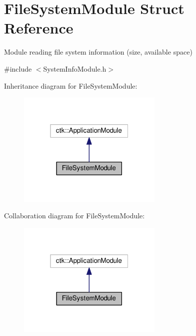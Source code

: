 \hypertarget{structFileSystemModule}{}\section{File\+System\+Module Struct Reference}
\label{structFileSystemModule}


Module reading file system information (size, available space)  




{\ttfamily \#include $<$System\+Info\+Module.\+h$>$}



Inheritance diagram for File\+System\+Module\+:
\nopagebreak
\begin{figure}[H]
\begin{center}
\leavevmode
\includegraphics[width=196pt]{structFileSystemModule__inherit__graph}
\end{center}
\end{figure}


Collaboration diagram for File\+System\+Module\+:
\nopagebreak
\begin{figure}[H]
\begin{center}
\leavevmode
\includegraphics[width=196pt]{structFileSystemModule__coll__graph}
\end{center}
\end{figure}
